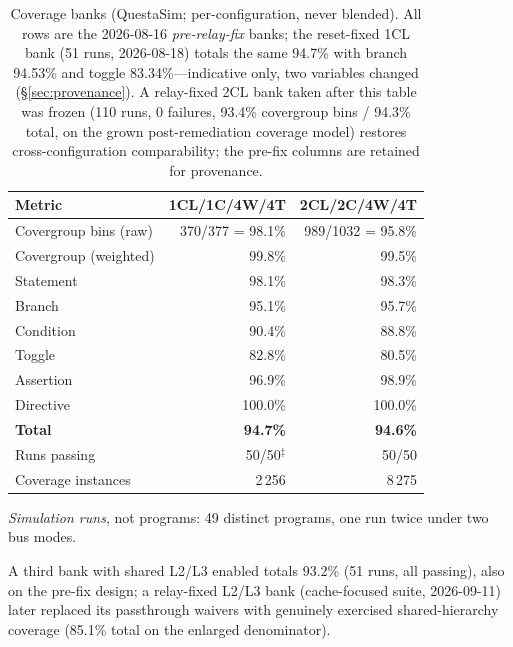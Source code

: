 \documentclass[conference]{IEEEtran}
\begin{document}
\begin{table}[t]
	\caption{Coverage banks (QuestaSim; per-configuration, never
		blended). All rows are the 2026-08-16 \emph{pre-relay-fix} banks;
		the reset-fixed 1CL bank (51 runs, 2026-08-18) totals the same
		94.7\% with branch 94.53\% and toggle 83.34\%---indicative only,
		two variables changed (\S\ref{sec:provenance}). A relay-fixed 2CL
		bank taken after this table was frozen (110 runs, 0 failures,
		93.4\% covergroup bins / 94.3\% total, on the grown
		post-remediation coverage model) restores cross-configuration
		comparability; the pre-fix columns are retained for provenance.}
	\label{tab:coverage}
	\centering
	\small
	\setlength{\tabcolsep}{4.5pt}
	\begin{threeparttable}
		\begin{tabular}{lrr}
			\toprule
			Metric                & 1CL/1C/4W/4T       & 2CL/2C/4W/4T      \\
			\midrule
			Covergroup bins (raw) & 370/377 = 98.1\%   & 989/1032 = 95.8\% \\
			Covergroup (weighted) & 99.8\%             & 99.5\%            \\
			Statement             & 98.1\%             & 98.3\%            \\
			Branch                & 95.1\%             & 95.7\%            \\
			Condition             & 90.4\%             & 88.8\%            \\
			Toggle                & 82.8\%             & 80.5\%            \\
			Assertion             & 96.9\%             & 98.9\%            \\
			Directive             & 100.0\%            & 100.0\%           \\
			\midrule
			\textbf{Total}        & \textbf{94.7\%}    & \textbf{94.6\%}   \\
			Runs passing          & 50/50$^{\ddagger}$ & 50/50             \\
			Coverage instances    & 2\,256             & 8\,275            \\
			\bottomrule
		\end{tabular}
		\begin{tablenotes}\footnotesize
			\item[$\ddagger$] \emph{Simulation runs}, not programs: 49
			distinct programs, one run twice under two bus modes.
			\item A third bank with shared L2/L3 enabled totals 93.2\%
			(51 runs, all passing), also on the pre-fix design; a
			relay-fixed L2/L3 bank (cache-focused suite, 2026-09-11)
			later replaced its passthrough waivers with genuinely
			exercised shared-hierarchy coverage (85.1\% total on the
			enlarged denominator).
		\end{tablenotes}
	\end{threeparttable}
\end{table}
\end{document}
